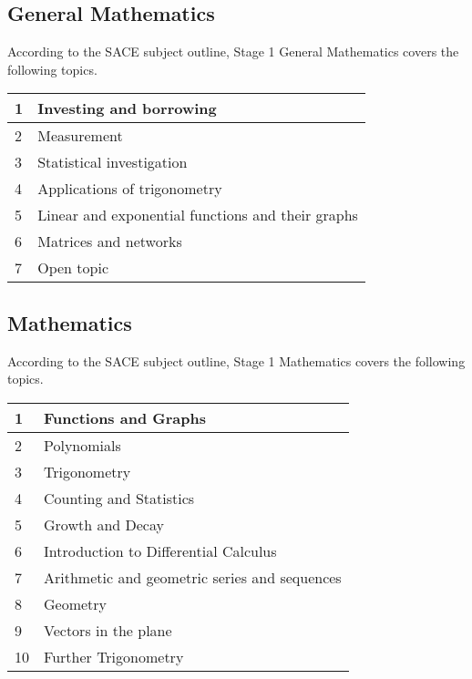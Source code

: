\documentclass[12pt]{report}
\begin{document}
\subsection{General Mathematics}

    According to the SACE subject outline, Stage 1 General Mathematics covers the following topics.
    \begin{table}[H]
        \centering
        \begin{tabular}{|l|l|}
        \hline
            1 & Investing and borrowing \\ \hline
            2 & Measurement \\ \hline
            3 & Statistical investigation \\ \hline
            4 & Applications of trigonometry \\ \hline
            5 & Linear and exponential functions and their graphs \\ \hline
            6 & Matrices and networks \\ \hline
            7 & Open topic \\ \hline
        \end{tabular}
    \end{table}

\subsection{Mathematics}

    According to the SACE subject outline, Stage 1 Mathematics covers the following topics.
    \begin{table}[H]
        \centering
        \begin{tabular}{|l|l|}
        \hline
            1 & Functions and Graphs \\ \hline
            2 & Polynomials \\ \hline
            3 & Trigonometry \\ \hline
            4 & Counting and Statistics \\ \hline
            5 & Growth and Decay \\ \hline
            6 & Introduction to Differential Calculus \\ \hline
            7 & Arithmetic and geometric series and sequences \\ \hline
            8 & Geometry \\ \hline
            9 & Vectors in the plane \\ \hline
            10 & Further Trigonometry \\ \hline
        \end{tabular}
    \end{table}
\end{document}
